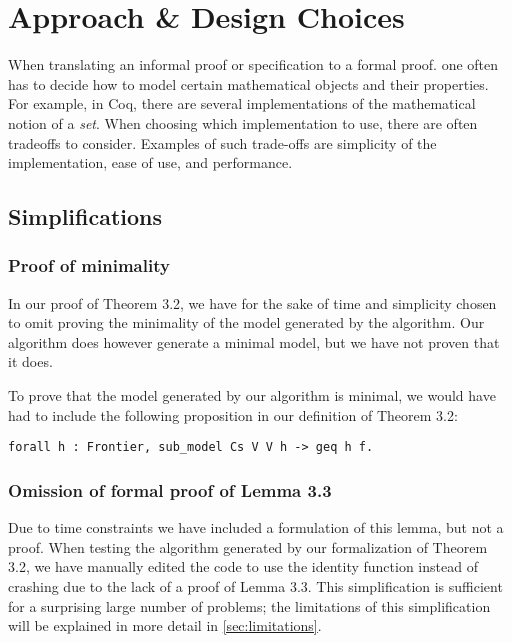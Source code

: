 \chapter{Approach \& Design Choices}

When translating an informal proof or specification to a formal proof.
one often has to decide how to model certain mathematical objects and their properties.
For example, in Coq, there are several implementations of the mathematical notion of a \textit{set}.
When choosing which implementation to use, there are often tradeoffs to consider.
Examples of such trade-offs are simplicity of the implementation, ease of use, and performance.

\section{Simplifications}

\subsection{Proof of minimality}

In our proof of Theorem 3.2, we have for the sake of time and simplicity
chosen to omit proving the minimality of the model generated by the algorithm.
Our algorithm does however generate a minimal model, but we have not proven
that it does.

To prove that the model generated by our algorithm is minimal,
we would have had to include the following proposition in our definition of Theorem 3.2:

\begin{minipage}{\linewidth}
\begin{lstlisting}[language=Coq, label={lst:minimal_model}, caption={Proposition for minimal model}]
forall h : Frontier, sub_model Cs V V h -> geq h f.
\end{lstlisting}
\end{minipage}

\subsection{Omission of formal proof of Lemma 3.3}

Due to time constraints we have included a formulation of this lemma, but not a proof.
When testing the algorithm generated by our formalization of Theorem 3.2,
we have manually edited the code to use the identity function instead of crashing due to
the lack of a proof of Lemma 3.3.
This simplification is sufficient for a surprising large number of problems;
the limitations of this simplification will be explained in more detail in \autoref{sec:limitations}.

